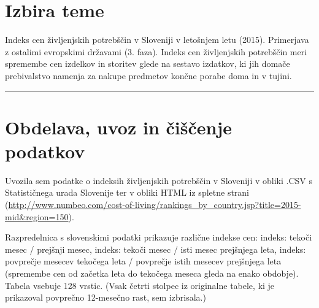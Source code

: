 \documentclass[]{article}
\begin{document}
\section{Izbira teme}\label{izbira-teme}

Indeks cen življenjskih potrebščin v Sloveniji v letošnjem letu (2015).
Primerjava z ostalimi evropskimi državami (3. faza). Indeks cen
življenjskih potrebščin meri spremembe cen izdelkov in storitev glede na
sestavo izdatkov, ki jih domače prebivalstvo namenja za nakupe predmetov
končne porabe doma in v tujini.

\begin{center}\rule{0.5\linewidth}{\linethickness}\end{center}

\section{Obdelava, uvoz in čiščenje
podatkov}\label{obdelava-uvoz-in-ciscenje-podatkov}

Uvozila sem podatke o indeksih življenjskih potrebščin v Sloveniji v
obliki .CSV s Statističnega urada Slovenije ter v obliki HTML iz spletne
strani
(\url{http://www.numbeo.com/cost-of-living/rankings_by_country.jsp?title=2015-mid\&region=150}).

Razpredelnica s slovenskimi podatki prikazuje različne indekse cen:
indeks: tekoči mesec / prejšnji mesec, indeks: tekoči mesec / isti mesec
prejšnjega leta, indeks: povprečje mesecev tekočega leta / povprečje
istih mesecev prejšnjega leta (spremembe cen od začetka leta do tekočega
meseca gleda na enako obdobje). Tabela vsebuje 128 vrstic. (Vsak četrti
stolpec iz originalne tabele, ki je prikazoval povprečno 12-mesečno
rast, sem izbrisala.)
\end{document}
